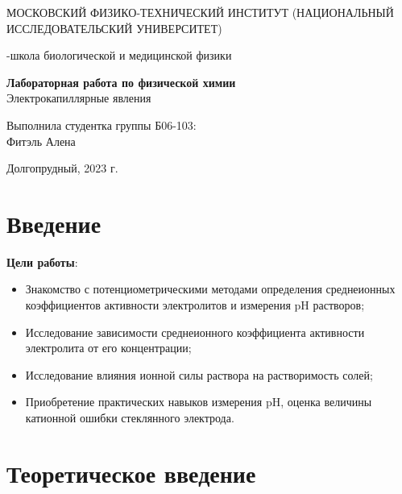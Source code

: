 \documentclass[a4paper,12pt]{article}
\begin{document}
\def\figurename{Рисунок}
\begin{titlepage}
\begin{center}
    {\large МОСКОВСКИЙ ФИЗИКО-ТЕХНИЧЕСКИЙ ИНСТИТУТ (НАЦИОНАЛЬНЫЙ ИССЛЕДОВАТЕЛЬСКИЙ УНИВЕРСИТЕТ)}
\end{center}
\begin{center}
    {-школа биологической и медицинской физики}
\end{center}

\vspace{1cm}
{\huge
\begin{center}
    {\bf Лабораторная работа по физической химии}\\
    \vspace{0.5cm}
    Электрокапиллярные явления
\end{center}
}

\vspace{4cm}
\begin{flushright}
{\LARGE Выполнила студентка группы Б06-103:\\ Фитэль Алена \\}

\end{flushright}
\vspace{9cm}
\begin{center}
    Долгопрудный, 2023 г.
\end{center}
\end{titlepage}
\newpage
\newpage
\section{Введение}
\setcounter{page}{2}
\textbf{Цели работы}: 
\begin{itemize}
	\item Знакомство с потенциометрическими методами определения среднеионных коэффициентов активности электролитов и измерения pH растворов;
	\item Исследование зависимости среднеионного коэффициента активности электролита от его концентрации;
	\item Исследование влияния ионной силы раствора на растворимость солей;
	\item Приобретение практических навыков измерения pH, оценка величины катионной ошибки стеклянного электрода. 
\end{itemize}
\section{Теоретическое введение}
\end{document}
